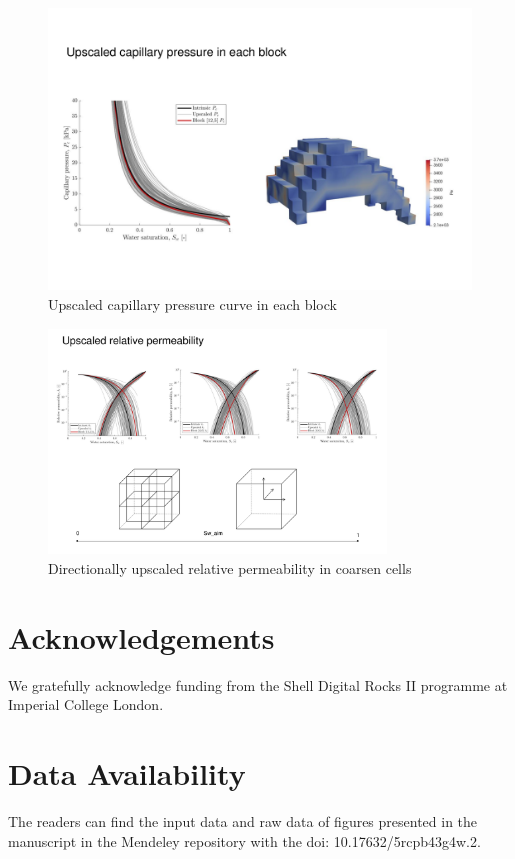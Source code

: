 \documentclass{article}
\begin{document}
\begin{figure}[H]
    \centering    \centerline{\includegraphics[width=1\textwidth]{Figures/Pe2.pdf}}
    \caption{Upscaled capillary pressure curve in each block}\label{Pe2}
\end{figure}

\begin{figure}[H]
    \centering    \centerline{\includegraphics[width=0.8\textwidth]{Figures/Permeability2.pdf}}
    \caption{Directionally upscaled relative permeability in coarsen cells}\label{Permeability2}
\end{figure}

\nocite{*}

\section*{Acknowledgements}
We gratefully acknowledge funding from the Shell Digital Rocks II programme at Imperial College London.

\section*{Data Availability}
The readers can find the input data and raw data of figures presented in the manuscript in the Mendeley repository with the doi: 10.17632/5rcpb43g4w.2.



\end{document}
